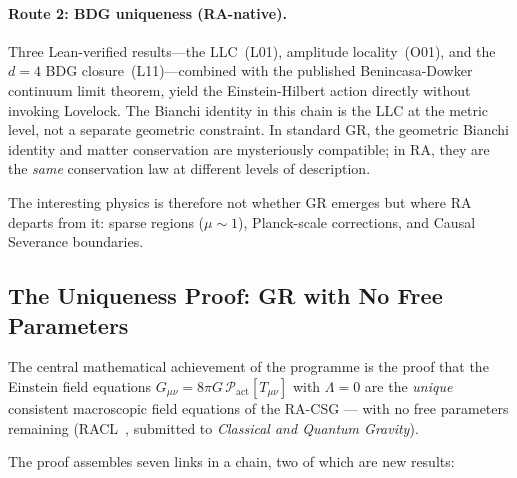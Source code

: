 \documentclass[11pt,a4paper]{article}
\newcommand{\Pact}{\mathcal{P}_{\mathrm{act}}}
\begin{document}
\paragraph{Route 2: BDG uniqueness (RA-native).}
Three Lean-verified results---the LLC~(L01), amplitude locality~(O01),
and the $d=4$ BDG closure~(L11)---combined with the published
Benincasa-Dowker continuum limit theorem, yield the Einstein-Hilbert
action directly without invoking Lovelock. The Bianchi identity in this
chain is the LLC at the metric level, not a separate geometric
constraint. In standard GR, the geometric Bianchi identity and matter
conservation are mysteriously compatible; in RA, they are the
\emph{same} conservation law at different levels of description.

The interesting physics is
therefore not whether GR emerges but where RA departs from it: sparse
regions ($\mu \sim 1$), Planck-scale corrections, and Causal Severance
boundaries.

\subsection{The Uniqueness Proof: GR with No Free Parameters}

The central mathematical achievement of the programme is the proof that
the Einstein field equations $G_{\mu\nu} = 8\pi G\,\Pact[T_{\mu\nu}]$
with $\Lambda = 0$ are the \emph{unique} consistent macroscopic field
equations of the RA-CSG --- with no free parameters remaining
(RACL~\citep{Sandeman2026RACL}, submitted to \emph{Classical and Quantum
Gravity}).

The proof assembles seven links in a chain, two of which are new results:
\end{document}
